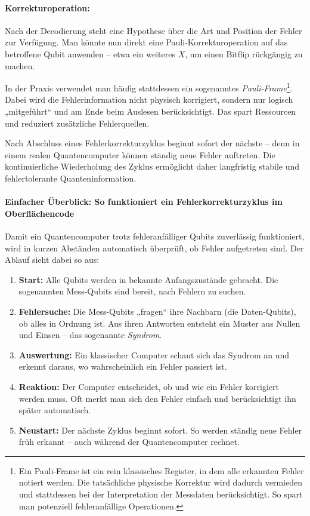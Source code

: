 \paragraph{Korrekturoperation:}

Nach der Decodierung steht eine Hypothese über die Art und Position der Fehler zur Verfügung. Man könnte nun direkt eine Pauli-Korrekturoperation auf das betroffene Qubit anwenden – etwa ein weiteres \(X\), um einen Bitflip rückgängig zu machen.

In der Praxis verwendet man häufig stattdessen ein sogenanntes \emph{Pauli-Frame}\footnote{Ein Pauli-Frame ist ein rein klassisches Register, in dem alle erkannten Fehler notiert werden. Die tatsächliche physische Korrektur wird dadurch vermieden und stattdessen bei der Interpretation der Messdaten berücksichtigt. So spart man potenziell fehleranfällige Operationen.}. Dabei wird die Fehlerinformation nicht physisch korrigiert, sondern nur logisch „mitgeführt“ und am Ende beim Auslesen berücksichtigt. Das spart Ressourcen und reduziert zusätzliche Fehlerquellen.

Nach Abschluss eines Fehlerkorrekturzyklus beginnt sofort der nächste – denn in einem realen Quantencomputer können ständig neue Fehler auftreten. Die kontinuierliche Wiederholung des Zyklus ermöglicht daher langfristig stabile und fehlertolerante Quanteninformation.
\medskip
\paragraph{Einfacher Überblick: So funktioniert ein Fehlerkorrekturzyklus im Oberflächencode}Damit ein Quantencomputer trotz fehleranfälliger Qubits zuverlässig funktioniert, wird in kurzen Abständen automatisch überprüft, ob Fehler aufgetreten sind. Der Ablauf sieht dabei so aus:

\begin{enumerate}
  \item \textbf{Start:}  
  Alle Qubits werden in bekannte Anfangszustände gebracht. Die sogenannten Mess-Qubits sind bereit, nach Fehlern zu suchen.

  \item \textbf{Fehlersuche:}  
  Die Mess-Qubits „fragen“ ihre Nachbarn (die Daten-Qubits), ob alles in Ordnung ist. Aus ihren Antworten entsteht ein Muster aus Nullen und Einsen – das sogenannte \emph{Syndrom}.

  \item \textbf{Auswertung:}  
  Ein klassischer Computer schaut sich das Syndrom an und erkennt daraus, wo wahrscheinlich ein Fehler passiert ist.

  \item \textbf{Reaktion:}  
  Der Computer entscheidet, ob und wie ein Fehler korrigiert werden muss. Oft merkt man sich den Fehler einfach und berücksichtigt ihn später automatisch.

  \item \textbf{Neustart:}  
  Der nächste Zyklus beginnt sofort. So werden ständig neue Fehler früh erkannt – auch während der Quantencomputer rechnet.
\end{enumerate}

